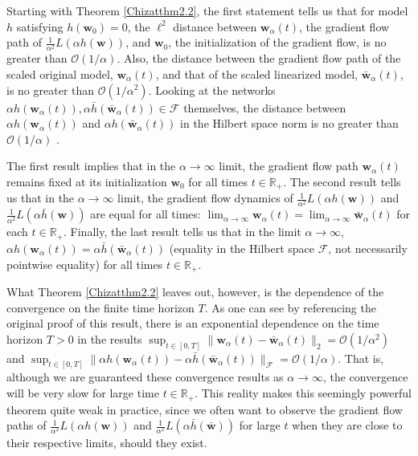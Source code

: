 \documentclass{article}
\begin{document}
Starting with Theorem \ref{Chizatthm2.2}, the first statement tells us that for model $h$ satisfying $h(\boldsymbol{w}_0) = 0$, the $\ell^2$ distance between $\boldsymbol{w}_{\alpha}(t)$, the gradient flow path of $\frac{1}{\alpha^2} L(\alpha h(\boldsymbol{w}))$, and $\boldsymbol{w}_0$, the initialization of the gradient flow, is no greater than $\mathcal{O}(1/\alpha)$. Also, the distance between the gradient flow path of the scaled original model, $\boldsymbol{w}_{\alpha}(t)$, and that of the scaled linearized model, $\boldsymbol{\bar{w}}_{\alpha}(t)$, is no greater than $\mathcal{O}(1/\alpha^2)$. Looking at the networks $\alpha h(\boldsymbol{w}_{\alpha}(t)), \alpha \bar{h}(\boldsymbol{\bar{w}}_{\alpha}(t)) \in \mathcal{F}$ themselves, the distance between $\alpha h(\boldsymbol{w}_{\alpha}(t))$ and $\alpha h(\boldsymbol{\bar{w}}_{\alpha}(t))$ in the Hilbert space norm is no greater than $\mathcal{O}(1/\alpha)$ \cite{chizat2019lazy}. 

The first result implies that in the $\alpha \rightarrow \infty$ limit, the gradient flow path $\boldsymbol{w}_{\alpha}(t)$ remains fixed at its initialization $\boldsymbol{w}_0$ for all times $t \in \mathbb{R}_+$. The second result tells us that in the $\alpha \rightarrow \infty$ limit, the gradient flow dynamics of $\frac{1}{\alpha^2} L(\alpha h(\boldsymbol{w}))$ and $\frac{1}{\alpha^2} L(\alpha \bar{h}(\boldsymbol{w}))$ are equal for all times: $\lim_{\alpha \to \infty} \boldsymbol{w}_{\alpha}(t) = \lim_{\alpha \to \infty} \boldsymbol{\bar{w}}_{\alpha}(t)$ for each $t \in \mathbb{R}_+$. Finally, the last result tells us that in the limit $\alpha \rightarrow \infty$, $\alpha h(\boldsymbol{w}_{\alpha}(t)) = \alpha \bar{h}(\boldsymbol{\bar{w}}_{\alpha}(t))$ (equality in the Hilbert space $\mathcal{F}$, not necessarily pointwise equality) for all times $t \in \mathbb{R}_+$.

What Theorem \ref{Chizatthm2.2} leaves out, however, is the dependence of the convergence on the finite time horizon $T$. As one can see by referencing the original proof of this result, there is an exponential dependence on the time horizon $T>0$ in the results $\sup_{t \in [0, T]} \| \boldsymbol{w}_{\alpha}(t) - \boldsymbol{\bar{w}}_{\alpha}(t) \|_2 = \mathcal{O}(1/\alpha^2)$ and $\sup_{t \in [0, T]} \| \alpha h(\boldsymbol{w}_{\alpha}(t)) - \alpha \bar{h}(\boldsymbol{\bar{w}}_{\alpha}(t)) \|_{\mathcal{F}} = \mathcal{O}(1/\alpha)$. That is, although we are guaranteed these convergence results as $\alpha \rightarrow \infty$, the convergence will be very slow for large time $t \in \mathbb{R}_+$. This reality makes this seemingly powerful theorem quite weak in practice, since we often want to observe the gradient flow paths of $\frac{1}{\alpha^2}L(\alpha h(\boldsymbol{w}))$ and $\frac{1}{\alpha^2}L(\alpha \bar{h}(\boldsymbol{\bar{w}}))$ for large $t$ when they are close to their respective limits, should they exist.
\end{document}
